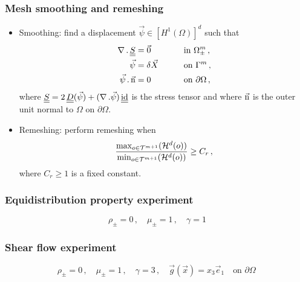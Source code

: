 \documentclass{beamer}
\newcommand{\sigmaO}{o}
\newcommand{\id}{\rm id}
\newcommand{\mat}[1]{\underline{\underline{#1}}\rule{0pt}{0pt}}
\begin{document}
\begin{frame}
\frametitle{Mesh smoothing and remeshing}

\begin{itemize}
\item Smoothing: find a displacement $\vec\psi \in [H^1(\Omega)]^d$ such that
\begin{subequations}
\begin{align*}
\nabla\,.\,\mat S & = \vec 0 \qquad &&\mbox{in } \Omega_\pm^m\,, \\
\vec\psi &= \delta \vec X \qquad && \mbox{on } \Gamma^m\,, \\
\vec\psi\,.\,\vec{\rm n} & = 0 \qquad &&\mbox{on } \partial\Omega\,,
\end{align*}
\end{subequations}
where $\mat S = 2\,\mat D(\vec\psi) +(\nabla\,.\vec\psi)\,\mat\id$ is the stress
tensor and where $\vec{\rm n}$ is the outer unit normal to $\Omega$ on
$\partial\Omega$.

\pause

\item Remeshing: perform remeshing when
\begin{equation*}
\frac{\max_{\sigmaO\in {\cal T}^{m+1}}(\mathcal{H}^{d}(\sigmaO))}
{\min_{\sigmaO\in\mathcal {T}^{m+1}}(\mathcal{H}^{d}(\sigmaO))} \geq C_r\,,
\end{equation*}
where $C_r \geq 1$ is a fixed constant.
\end{itemize}
\end{frame}

\begin{frame}
\frametitle{Equidistribution property experiment}

\begin{equation*}
\rho_\pm = 0\,,\quad \mu_\pm = 1\,,\quad \gamma = 1
\end{equation*}

\centering

\end{frame}

\begin{frame}
\frametitle{Shear flow experiment}

\begin{equation*}
\rho_\pm = 0\,,\quad \mu_\pm = 1\,,\quad \gamma = 3\,,\quad
\vec g(\vec x) = x_3\vec e_1\quad \mbox{on }\partial\Omega\,
\end{equation*}

\centering

\end{frame}
\end{document}

